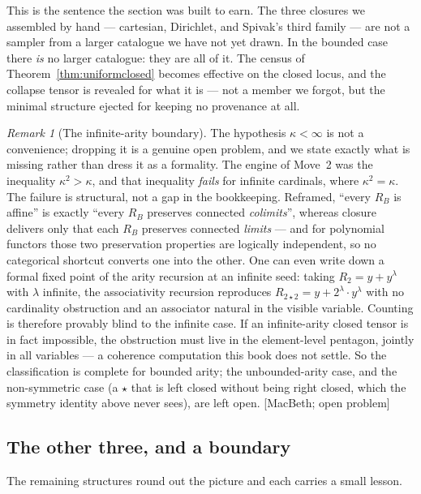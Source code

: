 \documentclass[11pt,a4paper]{book}
\theoremstyle{plain}
\theoremstyle{definition}
\theoremstyle{remark}
\newtheorem{Remark}[Theorem]{Remark}
\newcommand{\prov}[1]{\hfill\textsf{\footnotesize[#1]}}
\begin{document}
This is the sentence the section was built to earn. The three closures we assembled
by hand --- cartesian, Dirichlet, and Spivak's third family --- are not a sampler
from a larger catalogue we have not yet drawn. In the bounded case there \emph{is} no
larger catalogue: they are all of it. The census of Theorem~\ref{thm:uniformclosed}
becomes effective on the closed locus, and the collapse tensor is revealed for what
it is --- not a member we forgot, but the minimal structure ejected for keeping no
provenance at all.

\begin{Remark}[The infinite-arity boundary]\label{rem:infarity}
The hypothesis $\kappa<\infty$ is not a convenience; dropping it is a genuine open
problem, and we state exactly what is missing rather than dress it as a formality.
The engine of Move~2 was the inequality $\kappa^2>\kappa$, and that inequality
\emph{fails} for infinite cardinals, where $\kappa^2=\kappa$. The failure is
structural, not a gap in the bookkeeping. Reframed, ``every $R_B$ is affine'' is
exactly ``every $R_B$ preserves connected \emph{colimits}'', whereas closure delivers
only that each $R_B$ preserves connected \emph{limits} --- and for polynomial
functors those two preservation properties are logically independent, so no
categorical shortcut converts one into the other. One can even write down a formal
fixed point of the arity recursion at an infinite seed: taking $R_2=y+y^\lambda$ with
$\lambda$ infinite, the associativity recursion reproduces
$R_{2\star 2}=y+2^\lambda\cdot y^\lambda$ with no cardinality obstruction and an
associator natural in the visible variable. Counting is therefore provably blind to
the infinite case. If an infinite-arity closed tensor is in fact impossible, the
obstruction must live in the element-level pentagon, jointly in all variables --- a
coherence computation this book does not settle. So the classification is complete
for bounded arity; the unbounded-arity case, and the non-symmetric case (a $\star$
that is left closed without being right closed, which the symmetry identity above
never sees), are left open. \prov{MacBeth; open problem}
\end{Remark}

\subsection{The other three, and a boundary}

The remaining structures round out the picture and each carries a small lesson.
\end{document}
